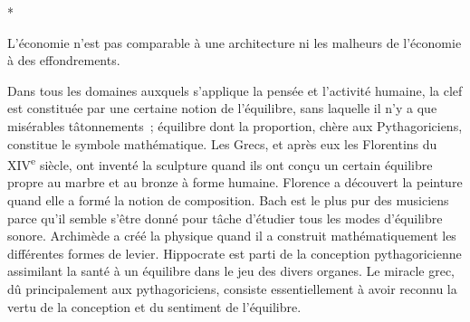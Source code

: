 \documentclass[french,twoside]{book} %
\begin{document}
\begin{center}
*\end{center}
\noindent L'économie n'est pas comparable à une architecture ni les malheurs de l'économie à des effondrements.\par
Dans tous les domaines auxquels s'applique la pensée et l'activité humaine, la clef est constituée par une certaine notion de l'équilibre, sans laquelle il n'y a que misérables tâtonnements ; équilibre dont la proportion, chère aux Pythagoriciens, constitue le symbole mathématique. Les Grecs, et après eux les Florentins du XIV\textsuperscript{e} siècle, ont inventé la sculpture quand ils ont conçu un certain équilibre propre au marbre et au bronze à forme humaine. Florence a découvert la peinture quand elle a formé la notion de composition. Bach est le plus pur des musiciens parce qu'il semble s'être donné pour tâche d'étudier tous les modes d'équilibre sonore. Archimède a créé la physique quand il a construit mathématiquement les différentes formes de levier. Hippocrate est parti de la conception pythagoricienne assimilant la santé à un équilibre dans le jeu des divers organes. Le miracle grec, dû principalement aux pythago­riciens, consiste essentiellement à avoir reconnu la vertu de la conception et du sentiment de l'équilibre.\par
\end{document}
